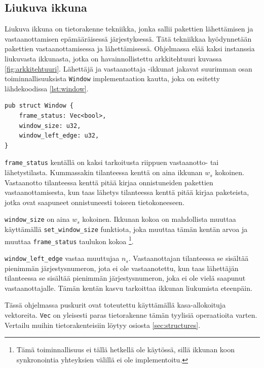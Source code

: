 \documentclass[a4paper,12pt]{article}
\begin{document}
    \subsection{Liukuva ikkuna}\label{sec:liukuva_ikkuna}
    \slidingWindow
    Liukuva ikkuna on tietorakenne tekniikka, jonka sallii pakettien lähettämisen ja vastaanottamisen epämääräisessä järjestyksessä. 
    Tätä tekniikkaa hyödynnetään pakettien vastaanottamisessa ja lähettämisessä. Ohjelmassa elää kaksi instanssia liukuvasta ikkunasta, jotka on havainnollistettu arkkitehtuuri kuvassa \ref{fig:arkkitehtuuri}. Lähettäjä ja vastaanottaja -ikkunat jakavat suurimman osan toiminnallisuuksista \lstinline{Window} implementaation kautta, joka on esitetty lähdekoodissa \ref{lst:window}. 

    
\begin{lstlisting}[caption={Ikkunan rakenne}, label={lst:window}]
pub struct Window {
    frame_status: Vec<bool>,
    window_size: u32,
    window_left_edge: u32,
}\end{lstlisting}

\lstinline{frame_status} kentällä on kaksi tarkoitusta riippuen vastaanotto- tai lähetystilasta. Kummassakin tilanteessa kenttä on aina ikkunan $w_s$ kokoinen. Vastaanotto tilanteessa kenttä pitää kirjaa onnistuneiden pakettien vastaanottamisesta, kun taas lähetys tilanteessa kenttä pitää kirjaa paketeista, jotka ovat saapuneet onnistuneesti toiseen tietokoneeseen. \par

\lstinline{window_size} on aina $w_s$ kokoinen. Ikkunan kokoa on mahdollista muuttaa käyttämällä \lstinline{set_window_size} funktiota, joka muuttaa tämän kentän arvoa ja muuttaa \lstinline{frame_status} taulukon kokoa \footnote{Tämä toiminnallisuus ei tällä hetkellä ole käytössä, sillä ikkunan koon synkronointia yhteyksien välillä ei ole implementoitu.}.\par

\lstinline{window_left_edge} vastaa muuttujaa $n_s$. Vastaanottajan tilanteessa se sisältää pienimmän järjestysnumeron, jota ei ole vastaanotettu, kun taas lähettäjän tilanteessa se sisältää pienimmän järjestysnumeron, joka ei ole vielä saapunut vastaanottajalle. Tämän kentän kasvu tarkoittaa ikkunan liukumista eteenpäin. 

    Tässä ohjelmassa puskurit ovat toteutettu käyttämällä kasa-allokoituja vektoreita. \lstinline{Vec} on yleisesti paras tietorakenne tämän tyylisiä operaatioita varten. Vertailu muihin tietorakenteisiin löytyy osiosta \ref{sec:structures}.
\end{document}
